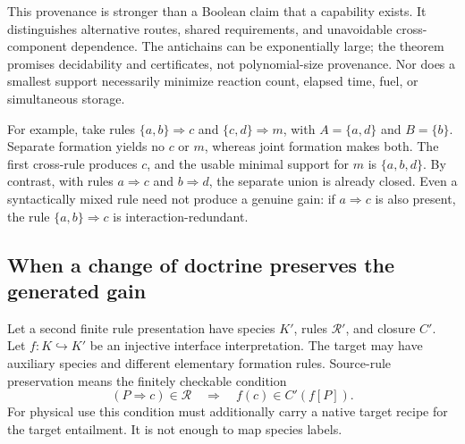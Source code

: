 \documentclass[11pt]{article}
\theoremstyle{definition}
\theoremstyle{remark}
\begin{document}
This provenance is stronger than a Boolean claim that a capability exists.
It distinguishes alternative routes, shared requirements, and unavoidable
cross-component dependence. The antichains can be exponentially large;
the theorem promises decidability and certificates, not polynomial-size
provenance. Nor does a smallest support necessarily minimize reaction
count, elapsed time, fuel, or simultaneous storage.

For example, take rules $\{a,b\}\Rightarrow c$ and
$\{c,d\}\Rightarrow m$, with $A=\{a,d\}$ and $B=\{b\}$.
Separate formation yields no $c$ or $m$, whereas joint formation makes
both. The first cross-rule produces $c$, and the usable minimal support
for $m$ is $\{a,b,d\}$. By contrast, with rules
$a\Rightarrow c$ and $b\Rightarrow d$, the separate union is already
closed. Even a syntactically mixed rule need not produce a genuine gain:
if $a\Rightarrow c$ is also present, the rule
$\{a,b\}\Rightarrow c$ is interaction-redundant.

\subsection{When a change of doctrine preserves the generated gain}

Let a second finite rule presentation have species $K'$, rules
$\mathcal R'$, and closure $C'$. Let $f:K\hookrightarrow K'$ be an
injective interface interpretation. The target may have auxiliary
species and different elementary formation rules. Source-rule preservation
means the finitely checkable condition
\[
   (P\Rightarrow c)\in\mathcal R
       \quad\Longrightarrow\quad f(c)\in C'(f[P]).
\tag{P}
\]
For physical use this condition must additionally carry a native target
recipe for the target entailment. It is not enough to map species labels.
\end{document}
